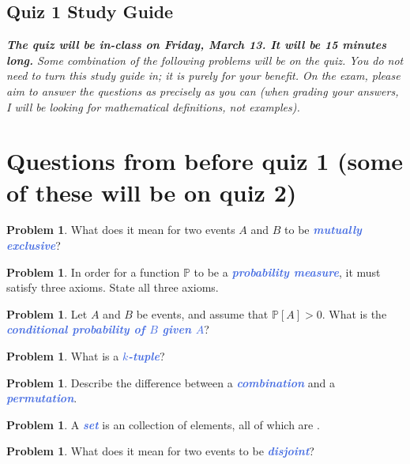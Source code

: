\documentclass[10pt]{article}
\newcommand{\demph}[1]{\textcolor{RoyalBlue}{\textbf{\slshape #1}}} %
\theoremstyle{definition}
\newtheorem{problem}[theorem]{Problem}
\renewcommand{\P}{\mathbb{P}}         %
\begin{document}
\begin{center}
  \subsection*{Quiz 1 Study Guide}
\end{center}
\textit{\textbf{The quiz will be in-class on Friday, March 13. It will be 15
    minutes long.} Some combination of the following problems will be on the
  quiz. You do not need to turn this study guide in; it is purely for your
  benefit. On the exam, please aim to answer the questions as precisely as you
  can (when grading your answers, I will be looking for mathematical
  definitions, not examples).} \vspace{1em}

\section{Questions from before quiz 1 (some of these will be on quiz 2)}

\begin{problem}
  What does it mean for two events $A$ and $B$ to be \demph{mutually exclusive}?
\end{problem}

\begin{problem}
  In order for a function $\P$ to be a \demph{probability measure}, it must
  satisfy three axioms. State all three axioms.
\end{problem}


\begin{problem}
  Let $A$ and $B$ be events, and assume that $\P\left[A \right]>0$. What is the
  \demph{conditional probability of $B$ given $A$}?
\end{problem}

\begin{problem}
  What is a \demph{$k$-tuple}?
\end{problem}

\begin{problem}
  Describe the difference between a \demph{combination} and a \demph{permutation}.
\end{problem}

\begin{problem}
  A \demph{set} is an \underline{\phantom{\quad \quad \quad \quad}} collection
  of elements, all of which are \underline{\phantom{\quad \quad \quad \quad}}.
\end{problem}

\begin{problem}
  What does it mean for two events to be \demph{disjoint}?
\end{problem}
\end{document}
